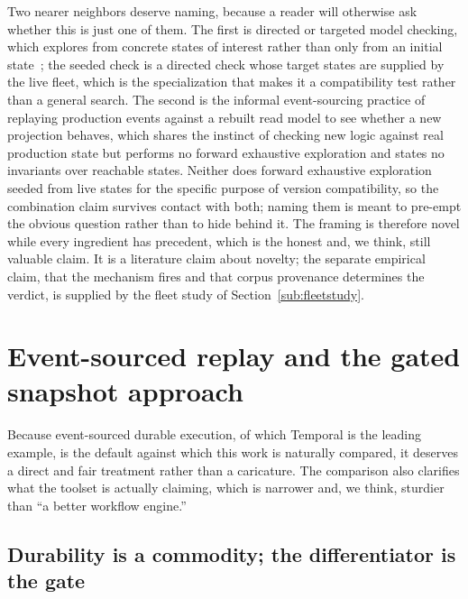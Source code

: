 \documentclass[11pt]{article}
\begin{document}
Two nearer neighbors deserve naming, because a reader will otherwise ask whether
this is just one of them. The first is directed or targeted model checking, which
explores from concrete states of interest rather than only from an initial
state~\cite{directed}; the seeded check is a directed check whose target states
are supplied by the live fleet, which is the specialization that makes it a
compatibility test rather than a general search. The second is the informal event-sourcing practice of replaying
production events against a rebuilt read model to see whether a new projection
behaves, which shares the instinct of checking new logic against real production
state but performs no forward exhaustive exploration and states no invariants over
reachable states. Neither does forward exhaustive exploration seeded from live
states for the specific purpose of version compatibility, so the combination
claim survives contact with both; naming them is meant to pre-empt the obvious
question rather than to hide behind it. The framing is therefore novel while
every ingredient has precedent, which is the honest and, we think, still valuable
claim. It is a literature claim about novelty; the separate empirical claim, that
the mechanism fires and that corpus provenance determines the verdict, is
supplied by the fleet study of Section~\ref{sub:fleetstudy}.

\section{Event-sourced replay and the gated snapshot approach}

Because event-sourced durable execution, of which Temporal is the leading
example, is the default against which this work is naturally compared, it
deserves a direct and fair treatment rather than a caricature. The comparison
also clarifies what the toolset is actually claiming, which is narrower and, we
think, sturdier than ``a better workflow engine.''

\subsection{Durability is a commodity; the differentiator is the gate}
\end{document}
